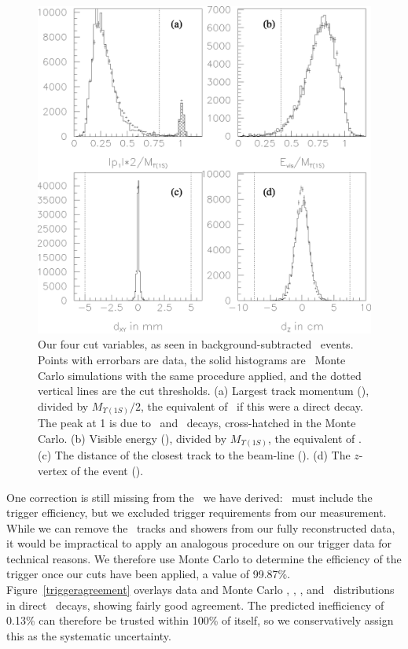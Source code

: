 \documentclass{cornell}
\begin{document}
\begin{figure}[p]
  \begin{center}
    \includegraphics[width=0.9\linewidth]{cascadeagreement}
  \end{center}
  \caption[Test of the Monte Carlo simulation in \us\ recoils from
  \twotoone\ decays]{\label{cascadeagreement} Our four cut variables,
  as seen in background-subtracted \twotoone\ events.  Points with
  errorbars are data, the solid histograms are \twotoone\ Monte Carlo
  simulations with the same procedure applied, and the dotted vertical
  lines are the cut thresholds.  (a) Largest track momentum (\pmax),
  divided by $M_{\Upsilon(1S)}/2$, the equivalent of \ebeam\ if this
  were a direct decay.  The peak at 1 is due to \ee\ and \mumu\
  decays, cross-hatched in the Monte Carlo.  (b) Visible energy
  (\visen), divided by $M_{\Upsilon(1S)}$, the equivalent of \ecm.
  (c) The distance of the closest track to the beam-line (\dxy).  (d)
  The $z$-vertex of the event (\dz).}
\end{figure}

One correction is still missing from the \ecuts\ we have derived:
\ecuts\ must include the trigger efficiency, but we excluded trigger
requirements from our measurement.  While we can remove the \pipi\
tracks and showers from our fully reconstructed data, it would be
impractical to apply an analogous procedure on our trigger data for
technical reasons.  We therefore use Monte Carlo to determine the
efficiency of the trigger once our cuts have been applied, a value of
99.87\%.  Figure~\ref{triggeragreement} overlays data and Monte Carlo
\axial, \stereo, \cblo, and \cbmd\ distributions in direct \us\
decays, showing fairly good agreement.  The predicted inefficiency of
0.13\% can therefore be trusted within 100\% of itself, so we
conservatively assign this as the systematic uncertainty.
\end{document}
